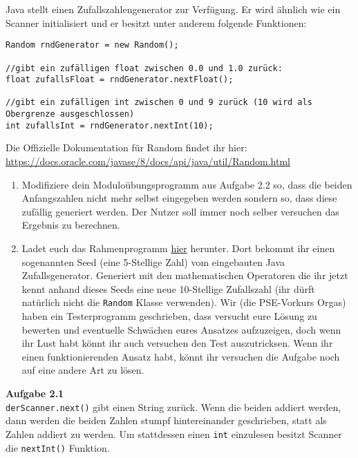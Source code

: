 \documentclass{../../sheet}
\begin{document}
\newpage
{}
Java stellt einen Zufallszahlengenerator zur Verfügung. Er wird ähnlich wie ein Scanner initialisiert und er besitzt unter anderem folgende Funktionen:

\begin{verbatim}
Random rndGenerator = new Random();

//gibt ein zufälligen float zwischen 0.0 und 1.0 zurück:
float zufallsFloat = rndGenerator.nextFloat();

//gibt ein zufälligen int zwischen 0 und 9 zurück (10 wird als Obergrenze ausgeschlossen)
int zufallsInt = rndGenerator.nextInt(10);
\end{verbatim}
Die Offizielle Dokumentation für Random findet ihr hier: \url{https://docs.oracle.com/javase/8/docs/api/java/util/Random.html}

\begin{enumerate}
    \item Modifiziere dein Moduloübungsprogramm aus Aufgabe 2.2 so, dass die beiden Anfangszahlen nicht mehr selbst eingegeben werden sondern so, dass diese zufällig generiert werden. Der Nutzer soll immer noch selber versuchen das Ergebnis zu berechnen. 
    \item Ladet euch das Rahmenprogramm \href{https://fius.de/wp-content/uploads/2025/10/Day1Highperformer.zip}{hier} herunter. Dort bekommt ihr einen sogenannten Seed (eine 5-Stellige Zahl) vom eingebauten Java Zufallsgenerator. Generiert mit den mathematischen Operatoren die ihr jetzt kennt anhand dieses Seeds eine neue 10-Stellige Zufallszahl (ihr dürft natürlich nicht die \texttt{Random} Klasse verwenden). Wir (die PSE-Vorkurs Orgas) haben ein Testerprogramm geschrieben, dass versucht eure Lösung zu bewerten und eventuelle Schwächen eures Ansatzes aufzuzeigen, doch wenn ihr Lust habt könnt ihr auch versuchen den Test auszutricksen. Wenn ihr einen funktionierenden Ansatz habt, könnt ihr versuchen die Aufgabe noch auf eine andere Art zu lösen.   
\end{enumerate}

\newpage
{}
\hypertarget{Aufgabe_2.1}{}
\textbf{Aufgabe 2.1}\\
\texttt{derScanner.next()} gibt einen String zurück. Wenn die beiden addiert werden, dann werden die beiden Zahlen stumpf hintereinander geschrieben, statt als Zahlen addiert zu werden. Um stattdessen einen \texttt{int} einzulesen besitzt Scanner die \texttt{nextInt()} Funktion.
\end{document}
